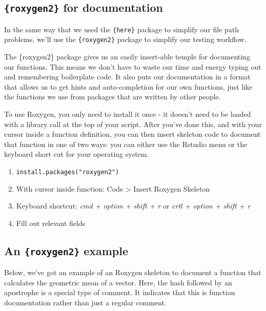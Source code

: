 \documentclass[
  letterpaper,
  DIV=11,
  numbers=noendperiod]{scrreprt}
\providecommand{\tightlist}{%
  \setlength{\itemsep}{0pt}\setlength{\parskip}{0pt}}\usepackage{longtable,booktabs,array}
\begin{document}
\subsection{\texorpdfstring{\texttt{\{roxygen2\}} for
documentation}{\{roxygen2\} for documentation}}\label{roxygen2-for-documentation}

In the same way that we used the \texttt{\{here\}} package to simplify
our file path problems, we'll use the \texttt{\{roxygen2\}} package to
simplify our testing workflow.

The \{roxygen2\} package gives us an easily insert-able temple for
documenting our functions. This means we don't have to waste our time
and energy typing out and remembering boilerplate code. It also puts our
documentation in a format that allows us to get hints and
auto-completion for our own functions, just like the functions we use
from packages that are written by other people.

To use Roxygen, you only need to install it once - it doesn't need to be
loaded with a library call at the top of your script. After you've done
this, and with your cursor inside a function definition, you can then
insert skeleton code to document that function in one of two ways: you
can either use the Rstudio menu or the keyboard short cut for your
operating system.

\begin{enumerate}
\def\labelenumi{\arabic{enumi}.}
\tightlist
\item
  \texttt{install.packages("roxygen2")}
\item
  With cursor inside function: Code \textgreater{} Insert Roxygen
  Skeleton
\item
  Keyboard shortcut: \emph{cmd + option + shift + r} or \emph{crtl +
  option + shift + r}
\item
  Fill out relevant fields
\end{enumerate}

\subsection{\texorpdfstring{An \texttt{\{roxygen2\}}
example}{An \{roxygen2\} example}}\label{an-roxygen2-example}

Below, we've got an example of an Roxygen skeleton to document a
function that calculates the geometric mean of a vector. Here, the hash
followed by an apostrophe is a special type of comment. It indicates
that this is function documentation rather than just a regular comment.
\end{document}

